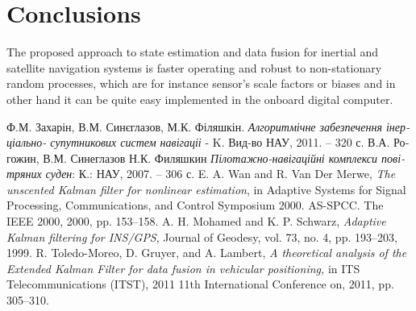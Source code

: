 \documentclass[conference, utf8]{IEEEtran}
\begin{document}
\section{Conclusions}
The proposed approach to state estimation and data fusion for inertial and 
satellite navigation systems is faster operating and robust to non-stationary
random processes, which are for instance sensor's scale factors or biases and 
in other hand it can be quite easy implemented in the onboard digital computer.

\begin{thebibliography}{1}

  \foreignlanguage{ukrainian}
{Ф.М. Захарін, В.М. Синєглазов, М.К. Філяшкін. \emph{Алгоритмічне забезпечення інерціально- супутникових систем навігаціі} - K. \:Вид-во НАУ, 2011. – 320 с.}
 \foreignlanguage{ukrainian}{В.А. Рогожин, В.М. Синеглазов Н.К. Филяшкин 
\emph{Пілотажно-навігаційні комплекси повітряних суден}: К.: НАУ, 2007. – 306 с.}
E. A. Wan and R. Van Der Merwe, 
\emph{The unscented Kalman filter for nonlinear estimation}, in Adaptive Systems for Signal Processing, Communications, and Control Symposium 2000. AS-SPCC. The IEEE 2000, 2000, pp. 153–158.
A. H. Mohamed and K. P. Schwarz, 
\emph{Adaptive Kalman filtering for INS/GPS}, Journal of Geodesy, vol. 73, no. 4, pp. 193–203, 1999.
R. Toledo-Moreo, D. Gruyer, and A. Lambert, 
\emph{A theoretical analysis of the Extended Kalman Filter for data fusion in vehicular positioning,} in ITS Telecommunications (ITST), 2011 11th International Conference on, 2011, pp. 305–310.


\end{thebibliography}




\end{document}

